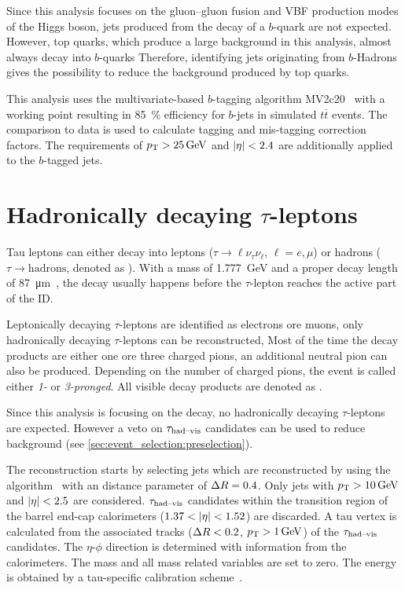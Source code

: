 Since this analysis focuses on the gluon--gluon fusion and VBF production modes of the Higgs boson, jets produced from
the decay of a $b$-quark are not expected.
However, top quarks, which produce a large background in this analysis, almost always decay into $b$-quarks
Therefore, identifying jets originating from $b$-Hadrons gives the possibility to reduce the background produced by top quarks.

This analysis uses the multivariate-based $b$-tagging algorithm MV2c20~\cite{PERF-2012-04,ATL-PHYS-PUB-2016-012} with
a working point resulting in \SI{85}{\percent} efficiency for $b$-jets in simulated $t\overline{t}$ events.
The comparison to data is used to calculate tagging and mis-tagging correction factors.
The requirements of $\pt > \SI{25}{\GeV}$ and $\left|\eta\right| < 2.4$ are additionally applied to the $b$-tagged jets.


\section{Hadronically decaying  $\tau$-leptons}\label{sec:object_selection:tau_leptons}

Tau leptons can either decay into leptons ($\tau \to \ell \nu_\tau \nu_\ell$, $\ell = e, \mu$) or hadrons
($\tau \to \text{hadrons}$, denoted as \tauhad{}).
With a mass of \SI{1.777}{\GeV} and a proper decay length of \SI{87}{\um}~\cite{PDG}, the decay usually happens before
the $\tau$-lepton reaches the active part of the ID\@.

Leptonically decaying $\tau$-leptons are identified as electrons ore muons, only hadronically decaying $\tau$-leptons can be reconstructed,
Most of the time the decay products are either one ore three charged pions, an additional neutral pion can also be produced.
Depending on the number of charged pions, the event is called either \emph{1-} or \emph{3-pronged}.
All visible decay products are denoted as \tauhadvis{}.

Since this analysis is focusing on the \Httllfull{} decay, no hadronically decaying $\tau$-leptons are expected.
However a veto on $\tau_\text{had--vis}$ candidates can be used to reduce background (see \cref{sec:event_selection:preselection}).

The reconstruction starts by selecting jets which are reconstructed by using the \antikt{} algorithm~\cite{Cacciari:2008gp,Cacciari:2005hq}
with an distance parameter of $\Delta R = 0.4$.
Only jets with $\pt > \SI{10}{\GeV}$ and $\left|\eta\right| < 2.5$ are considered.
$\tau_\text{had--vis}$ candidates within the transition region of the barrel end-cap calorimeters ($1.37 < \left|\eta\right| < 1.52$) are discarded.
A tau vertex is calculated from the associated tracks ($\Delta R < 0.2$, $\pt > \SI{1}{\GeV}$) of the $\tau_\text{had--vis}$ candidates.
The $\eta$-$\phi$ direction is determined with information from the calorimeters. %
The mass and all mass related variables are set to zero.
The energy is  obtained by a tau-specific calibration scheme~\cite{Run1TauPaper}.

